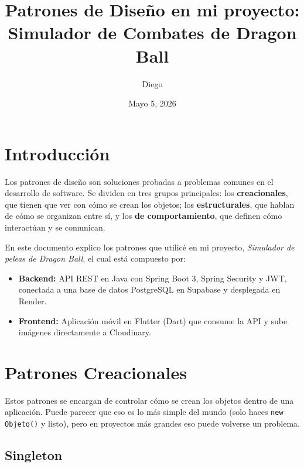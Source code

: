 \documentclass{article}
\title{Patrones de Dise\~no en mi proyecto:\\Simulador de Combates de Dragon Ball}
\author{Diego}
\date{Mayo 5, 2026}
\begin{document}
 
\maketitle
\tableofcontents
\newpage
 
\section{Introducci\'on}
 
Los patrones de dise\~no son soluciones probadas a problemas comunes en el
desarrollo de software. Se dividen en tres grupos principales: los
\textbf{creacionales}, que tienen que ver con c\'omo se crean los objetos;
los \textbf{estructurales}, que hablan de c\'omo se organizan entre s\'i, y
los \textbf{de comportamiento}, que definen c\'omo interact\'uan y se comunican.
 
En este documento explico los patrones que utilic\'e en mi proyecto,
\textit{Simulador de peleas de Dragon Ball}, el cual est\'a compuesto por:
 
\begin{itemize}
  \item \textbf{Backend:} API REST en Java con Spring Boot 3, Spring Security y
        JWT, conectada a una base de datos PostgreSQL en Supabase y desplegada
        en Render.
  \item \textbf{Frontend:} Aplicaci\'on m\'ovil en Flutter (Dart) que consume la
        API y sube im\'agenes directamente a Cloudinary.
\end{itemize}
 
\section{Patrones Creacionales}
 
Estos patrones se encargan de controlar c\'omo se crean los objetos dentro de
una aplicaci\'on. Puede parecer que eso es lo m\'as simple del mundo (solo haces
\texttt{new Objeto()} y listo), pero en proyectos m\'as grandes eso puede
volverse un problema.
 
\subsection{Singleton}
 
\end{document}
